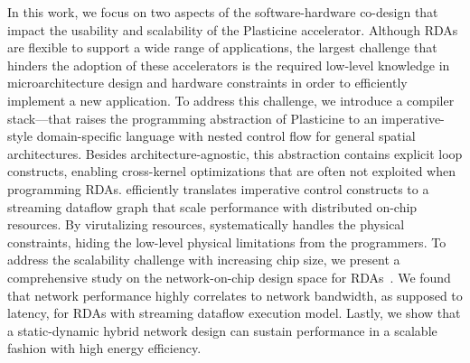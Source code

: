 In this work, we focus on two aspects of the software-hardware co-design that impact the usability
and scalability of the Plasticine accelerator. 
Although RDAs are flexible to support a wide range of applications, 
the largest challenge that hinders the adoption of these accelerators is 
the required low-level knowledge in microarchitecture design and hardware constraints in
order to efficiently implement a new application.
To address this challenge, we introduce a compiler stack--\name--that raises the programming abstraction of
Plasticine to an imperative-style domain-specific language with nested control
flow for general spatial architectures.
Besides architecture-agnostic, this abstraction contains explicit loop constructs, enabling
cross-kernel optimizations that are often not exploited when programming RDAs.
\name efficiently translates imperative control constructs to a streaming
dataflow graph that scale performance with distributed on-chip resources.
By virutalizing resources, \name systematically handles the physical constraints, hiding
the low-level physical limitations from the programmers.
To address the scalability challenge with increasing chip size, 
we present a comprehensive study on the network-on-chip design space for RDAs~\cite{network}.
We found that network performance highly correlates to network bandwidth, as supposed to latency,
for RDAs with streaming dataflow execution model.
Lastly, we show that a static-dynamic hybrid network design can sustain performance in a 
scalable fashion with high energy efficiency.
